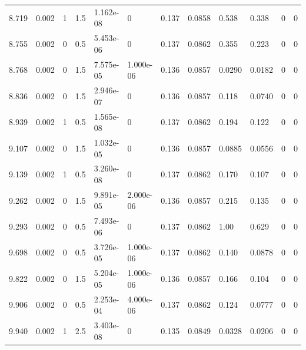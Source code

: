 \documentclass[preview]{standalone}
\begin{document}
{{{\begin{tabular}{L{1.2cm}C{1.2cm} C{0.3cm}C{0.5cm} C{1.4cm}C{1.4cm} C{1.4cm}C{1.4cm} C{1.6cm}C{1.6cm} C{1.6cm}C{1.6cm}}
  8.719  &  0.002  & 1     & 1.5 &  1.162e-08  & 0  &  0.137&   0.0858& 0.538 & 0.338   &  0 & 0  \\ 
  8.755  &  0.002  & 0     & 0.5 &  5.453e-06  & 0  &  0.137&   0.0862& 0.355 & 0.223   &  0 & 0  \\ 
  8.768  &  0.002  & 0     & 1.5 &  7.575e-05  & 1.000e-06  &  0.136&   0.0857& 0.0290 & 0.0182   &  0 & 0  \\ 
  8.836  &  0.002  & 0     & 1.5 &  2.946e-07  & 0  &  0.136&   0.0857& 0.118 & 0.0740   &  0 & 0  \\ 
  8.939  &  0.002  & 1     & 0.5 &  1.565e-08  & 0  &  0.137&   0.0862& 0.194 & 0.122   &  0 & 0  \\ 
  9.107  &  0.002  & 0     & 1.5 &  1.032e-05  & 0  &  0.136&   0.0857& 0.0885 & 0.0556   &  0 & 0  \\ 
  9.139  &  0.002  & 1     & 0.5 &  3.260e-08  & 0  &  0.137&   0.0862& 0.170 & 0.107   &  0 & 0  \\ 
  9.262  &  0.002  & 0     & 1.5 &  9.891e-05  & 2.000e-06  &  0.136&   0.0857& 0.215 & 0.135   &  0 & 0  \\ 
  9.293  &  0.002  & 0     & 0.5 &  7.493e-06  & 0  &  0.137&   0.0862& 1.00 & 0.629   &  0 & 0  \\ 
  9.698  &  0.002  & 0     & 0.5 &  3.726e-05  & 1.000e-06  &  0.137&   0.0862& 0.140 & 0.0878   &  0 & 0  \\ 
  9.822  &  0.002  & 0     & 1.5 &  5.204e-05  & 1.000e-06  &  0.136&   0.0857& 0.166 & 0.104   &  0 & 0  \\ 
  9.906  &  0.002  & 0     & 0.5 &  2.253e-04  & 4.000e-06  &  0.137&   0.0862& 0.124 & 0.0777   &  0 & 0  \\ 
  9.940  &  0.002  & 1     & 2.5 &  3.403e-08  & 0  &  0.135&   0.0849& 0.0328 & 0.0206   &  0 & 0  \\ 
\hline 
\end{tabular} 

}}}
\end{document}
